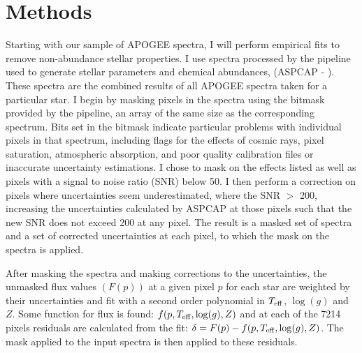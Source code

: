 \documentclass[preprint]{aastex}
\begin{document}
\section{Methods}
\label{sec:methods}

 
Starting with our sample of APOGEE spectra, I will perform empirical fits to remove non-abundance stellar properties. I use spectra processed by the pipeline used to generate stellar parameters and chemical abundances, (ASPCAP - \citealt{ASPCAP}). These spectra are the combined results of all APOGEE spectra taken for a particular star. I begin by masking pixels in the spectra using the bitmask provided by the pipeline, an array of the same size as the corresponding spectrum. Bits set in the bitmask indicate particular problems with individual pixels in that spectrum, including flags for the effects of cosmic rays, pixel saturation, atmospheric absorption, and poor quality calibration files or inaccurate uncertainty estimations. I chose to mask on the effects listed as well as pixels with a signal to noise ratio (SNR) below 50. I then perform a correction on pixels where uncertainties seem underestimated, where the SNR $>$ 200, increasing the uncertainties calculated by ASPCAP at those pixels such that the new SNR does not exceed 200 at any pixel. The result is a masked set of spectra and a set of corrected uncertainties at each pixel, to which the mask on the spectra is applied.



After masking the spectra and making corrections to the uncertainties,  the unmasked flux values $(F(p))$ at a given pixel $p$  for each star are weighted by their uncertainties and fit with a second order polynomial in $T_{\rm eff}$, $\log(g)$ and $Z$. Some function for flux is found: $f(p,T_{\rm eff},\log(g),Z)$ and at each of the 7214 pixels residuals are calculated from the fit: $\delta = F(p) - f(p,T_{\rm eff},\log(g),Z)$. The mask applied to the input spectra is then applied to these residuals. 

\end{document}
